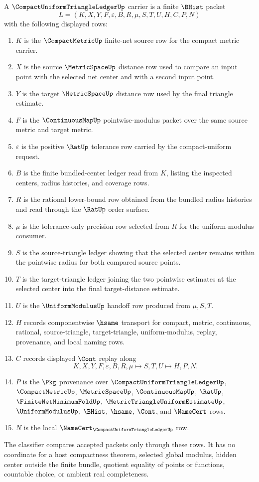 \begin{definition}
\label{def:compact-uniform-triangle-ledger-carrier}
A $\CompactUniformTriangleLedgerUp$ carrier is a finite $\BHist$ packet
$$
L=(K,X,Y,F,\varepsilon,B,R,\mu,S,T,U,H,C,P,N)
$$
with the following displayed rows:
\begin{enumerate}
\item $K$ is the $\CompactMetricUp$ finite-net source row for the compact metric carrier.
\item $X$ is the source $\MetricSpaceUp$ distance row used to compare an input point with the selected net center and with a second input point.
\item $Y$ is the target $\MetricSpaceUp$ distance row used by the final triangle estimate.
\item $F$ is the $\ContinuousMapUp$ pointwise-modulus packet over the same source metric and target metric.
\item $\varepsilon$ is the positive $\RatUp$ tolerance row carried by the compact-uniform request.
\item $B$ is the finite bundled-center ledger read from $K$, listing the inspected centers, radius histories, and coverage rows.
\item $R$ is the rational lower-bound row obtained from the bundled radius histories and read through the $\RatUp$ order surface.
\item $\mu$ is the tolerance-only precision row selected from $R$ for the uniform-modulus consumer.
\item $S$ is the source-triangle ledger showing that the selected center remains within the pointwise radius for both compared source points.
\item $T$ is the target-triangle ledger joining the two pointwise estimates at the selected center into the final target-distance estimate.
\item $U$ is the $\UniformModulusUp$ handoff row produced from $\mu,S,T$.
\item $H$ records componentwise $\hsame$ transport for compact, metric, continuous, rational, source-triangle, target-triangle, uniform-modulus, replay, provenance, and local naming rows.
\item $C$ records displayed $\Cont$ replay along
$$
K,X,Y,F,\varepsilon,B,R,\mu \longmapsto S,T,U \longmapsto H,P,N .
$$
\item $P$ is the $\Pkg$ provenance over $\CompactUniformTriangleLedgerUp$, $\CompactMetricUp$, $\MetricSpaceUp$, $\ContinuousMapUp$, $\RatUp$, $\FiniteNetMinimumFoldUp$, $\MetricTriangleUniformEstimateUp$, $\UniformModulusUp$, $\BHist$, $\hsame$, $\Cont$, and $\NameCert$ rows.
\item $N$ is the local $\NameCert_{\CompactUniformTriangleLedgerUp}$ row.
\end{enumerate}
The classifier compares accepted packets only through these rows. It has no coordinate for a host compactness theorem, selected global modulus, hidden center outside the finite bundle, quotient equality of points or functions, countable choice, or ambient real completeness.
\end{definition}

